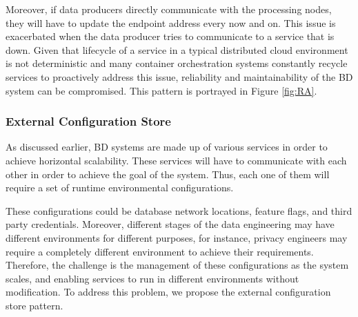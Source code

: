 \documentclass[a4paper,11pt,article,oneside]{memoir}
\begin{document}


Moreover, if data producers directly communicate with the processing nodes, they will have to update the endpoint address every now and on. This issue is exacerbated when the data producer tries to communicate to a service that is down. Given that lifecycle of a service in a typical distributed cloud environment is not deterministic and many container orchestration systems constantly recycle services to proactively address this issue, reliability and maintainability of the BD system can be compromised. This pattern is portrayed in Figure \ref{fig:RA}. 


\subsubsection{External Configuration Store}

As discussed earlier, BD systems are made up of various services in order to achieve horizontal scalability. These services will have to communicate with each other in order to achieve the goal of the system. Thus, each one of them will require a set of runtime environmental configurations. 

These configurations could be database network locations, feature flags, and third party credentials. Moreover, different stages of the data engineering may have different environments for different purposes, for instance, privacy engineers may require a completely different environment to achieve their requirements. Therefore, the challenge is the management of these configurations as the system scales, and enabling services to run in different environments without modification. To address this problem, we propose the external configuration store pattern.
\end{document}
